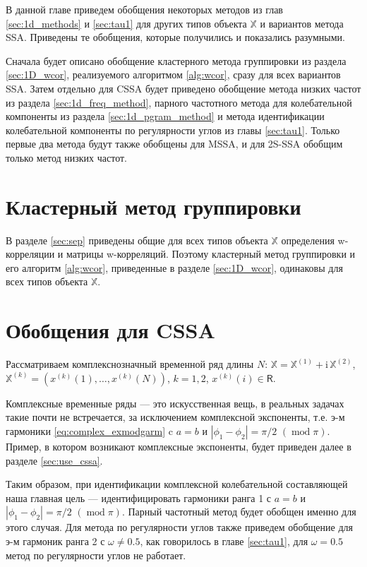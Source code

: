 \documentclass[specialist,
               substylefile = spbu.rtx,
               subf,href,colorlinks=true, 12pt]{disser}
\def\mod{\mathop{\mathrm{mod}}}
\newcommand{\I}{\mathrm{i}}
\begin{document}
В данной главе приведем обобщения некоторых методов из глав \ref{sec:1d_methods} и \ref{sec:tau1} для других типов объекта $\mathbb{X}$ и вариантов метода SSA. Приведены те обобщения, которые получились и  показались разумными.

Сначала будет описано обобщение кластерного метода группировки из раздела \ref{sec:1D_wcor}, реализуемого алгоритмом \ref{alg:wcor}, сразу для всех вариантов SSA.
Затем отдельно для CSSA будет приведено обобщение метода низких частот из раздела \ref{sec:1d_freq_method}, парного частотного метода для колебательной компоненты из раздела \ref{sec:1d_pgram_method} и метода идентификации колебательной компоненты по регулярности углов из главы \ref{sec:tau1}.
Только первые два метода будут также обобщены для MSSA, и для 2S-SSA обобщим только метод низких частот.

\section{Кластерный метод группировки}
В разделе \ref{sec:sep} приведены общие для всех типов объекта $\mathbb{X}$ определения w-корреляции и матрицы w-корреляций. Поэтому кластерный метод группировки и его алгоритм \ref{alg:wcor}, приведенные в разделе \ref{sec:1D_wcor}, одинаковы для всех типов объекта $\mathbb{X}$.

\section{Обобщения для CSSA}
Рассматриваем комплекснозначный временной ряд длины $N$: $\mathbb{X}=\mathbb{X}^{(1)} + \I \,\mathbb{X}^{(2)}$, $\mathbb{X}^{(k)}= \left(x^{(k)}(1),\ldots,x^{(k)}(N)\right)$, $k=1,2$, $x^{(k)}(i) \in \mathsf{R}$.

Комплексные временные ряды --- это искусственная вещь, в реальных задачах такие почти не встречается, за исключением комплексной экспоненты, т.е. э-м гармоники \eqref{eq:complex_exmodgarm} c $a=b$ и $|\phi_1 - \phi_2| = \pi/2 \,\,(\mod \pi)$. Пример, в котором возникают комплексные экспоненты, будет приведен далее в разделе \ref{sec:use_cssa}.

Таким образом, при идентификации комплексной колебательной составляющей наша главная цель --- идентифицировать гармоники ранга 1 с $a=b$ и $|\phi_1 - \phi_2| = \pi/2 \,\,(\mod \pi)$.
Парный частотный метод будет обобщен именно для этого случая. Для метода по регулярности углов также приведем обобщение для э-м гармоник ранга 2 с $\omega \not = 0.5$, как говорилось в главе \ref{sec:tau1}, для $\omega=0.5$ метод по регулярности углов не работает. 
\end{document}
